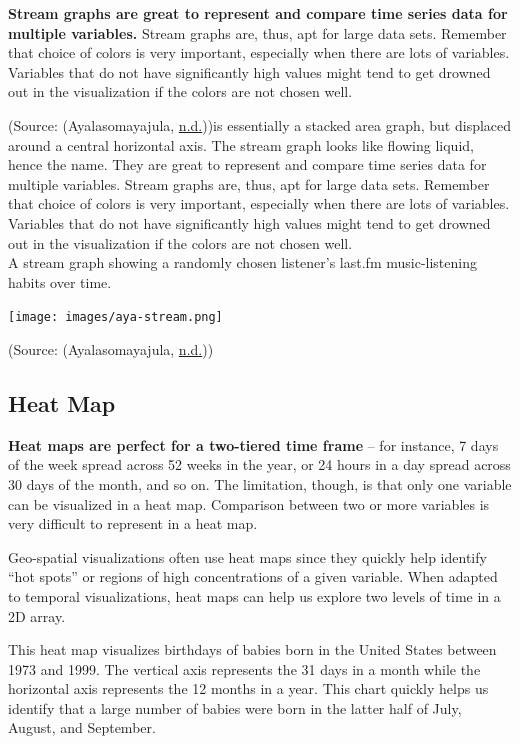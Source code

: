 \documentclass[]{book}
\begin{document}
\textbf{Stream graphs are great to represent and compare time series data for multiple variables.} Stream graphs are, thus, apt for large data sets. Remember that choice of colors is very important, especially when there are lots of variables. Variables that do not have significantly high values might tend to get drowned out in the visualization if the colors are not chosen well.

(Source: (Ayalasomayajula, \protect\hyperlink{ref-aya-time-series}{n.d.}))is essentially a stacked area graph, but displaced around a central horizontal axis. The stream graph looks like flowing liquid, hence the name. They are great to represent and compare time series data for multiple variables. Stream graphs are, thus, apt for large data sets. Remember that choice of colors is very important, especially when there are lots of variables. Variables that do not have significantly high values might tend to get drowned out in the visualization if the colors are not chosen well.\\
A stream graph showing a randomly chosen listener's last.fm music-listening habits over time.

\texttt{[image: images/aya-stream.png]}

(Source: (Ayalasomayajula, \protect\hyperlink{ref-aya-time-series}{n.d.}))

\hypertarget{heat-map}{%
\subsection{Heat Map}\label{heat-map}}

\textbf{Heat maps are perfect for a two-tiered time frame} -- for instance, 7 days of the week spread across 52 weeks in the year, or 24 hours in a day spread across 30 days of the month, and so on. The limitation, though, is that only one variable can be visualized in a heat map. Comparison between two or more variables is very difficult to represent in a heat map.

Geo-spatial visualizations often use heat maps since they quickly help identify ``hot spots'' or regions of high concentrations of a given variable. When adapted to temporal visualizations, heat maps can help us explore two levels of time in a 2D array.

This heat map visualizes birthdays of babies born in the United States between 1973 and 1999. The vertical axis represents the 31 days in a month while the horizontal axis represents the 12 months in a year. This chart quickly helps us identify that a large number of babies were born in the latter half of July, August, and September.
\end{document}
